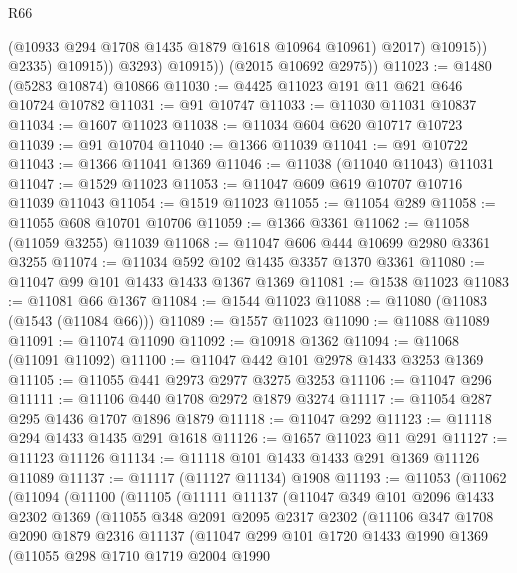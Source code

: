 \begin{lexlean}{R66}
\begin{coremodule}
                        (@10933 @294 @1708 @1435 @1879 @1618 @10964 @10961)
                        @2017)
                      @10915))
                  @2335)
                @10915))
            @3293)
          @10915))
      (@2015 @10692 @2975))
@11023 := @1480 (@5283 @10874) @10866
@11030 := @4425 @11023 @191 @11 @621 @646 @10724 @10782
@11031 := @91 @10747
@11033 := @11030 @11031 @10837
@11034 := @1607 @11023
@11038 := @11034 @604 @620 @10717 @10723
@11039 := @91 @10704
@11040 := @1366 @11039
@11041 := @91 @10722
@11043 := @1366 @11041 @1369
@11046 := @11038 (@11040 @11043) @11031
@11047 := @1529 @11023
@11053 := @11047 @609 @619 @10707 @10716 @11039 @11043
@11054 := @1519 @11023
@11055 := @11054 @289
@11058 := @11055 @608 @10701 @10706
@11059 := @1366 @3361
@11062 := @11058 (@11059 @3255) @11039
@11068 := @11047 @606 @444 @10699 @2980 @3361 @3255
@11074 := @11034 @592 @102 @1435 @3357 @1370 @3361
@11080 := @11047 @99 @101 @1433 @1433 @1367 @1369
@11081 := @1538 @11023
@11083 := @11081 @66 @1367
@11084 := @1544 @11023
@11088 := @11080 (@11083 (@1543 (@11084 @66)))
@11089 := @1557 @11023
@11090 := @11088 @11089
@11091 := @11074 @11090
@11092 := @10918 @1362
@11094 := @11068 (@11091 @11092)
@11100 := @11047 @442 @101 @2978 @1433 @3253 @1369
@11105 := @11055 @441 @2973 @2977 @3275 @3253
@11106 := @11047 @296
@11111 := @11106 @440 @1708 @2972 @1879 @3274
@11117 := @11054 @287 @295 @1436 @1707 @1896 @1879
@11118 := @11047 @292
@11123 := @11118 @294 @1433 @1435 @291 @1618
@11126 := @1657 @11023 @11 @291
@11127 := @11123 @11126
@11134 := @11118 @101 @1433 @1433 @291 @1369 @11126 @11089
@11137 := @11117 (@11127 @11134) @1908
@11193 := @11053
    (@11062
      (@11094
        (@11100
          (@11105
            (@11111
              @11137
              (@11047
                @349
                @101
                @2096
                @1433
                @2302
                @1369
                (@11055
                  @348
                  @2091
                  @2095
                  @2317
                  @2302
                  (@11106
                    @347
                    @1708
                    @2090
                    @1879
                    @2316
                    @11137
                    (@11047
                      @299
                      @101
                      @1720
                      @1433
                      @1990
                      @1369
                      (@11055
                        @298
                        @1710
                        @1719
                        @2004
                        @1990

\end{coremodule}
\end{lexlean}
